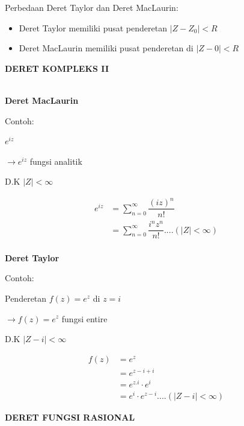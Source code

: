 \documentclass{article}
\begin{document}
Perbedaan Deret Taylor dan Deret MacLaurin:
\begin{itemize}
    \item Deret Taylor memiliki pusat penderetan $|Z-Z_0|<R$
    \item Deret MacLaurin memiliki pusat penderetan di $|Z-0|<R$
\end{itemize}



\newpage
\begin{center}
    \textbf{DERET KOMPLEKS II}
\end{center}
\leavevmode\\

\textbf{Deret MacLaurin}

Contoh:

$e^{iz}$

$\rightarrow e^{iz}$ fungsi analitik

D.K $|Z|<\infty$

\begin{align}
    e^{iz} & = \sum_{n=0}^{\infty} \dfrac{(iz)^n}{n!}
    \nonumber                                                             \\
           & = \sum_{n=0}^{\infty} \dfrac{i^n z^n}{n!} .... (|Z|< \infty)
    \nonumber
\end{align}
\leavevmode\\

\textbf{Deret Taylor}

Contoh:

Penderetan $f(z) = e^z$ di $z = i$

$\rightarrow f(z) = e^z$ fungsi entire

D.K $|Z-i|<\infty$

\begin{align}
    f(z) & = e^z
    \nonumber                                       \\
         & = e^{z-i+i}
    \nonumber                                       \\
         & = e^{z.i} \cdot e^i
    \nonumber                                       \\
         & = e^i \cdot e^{z-i} .... (|Z-i|< \infty)
    \nonumber
\end{align}



\newpage
\begin{center}
    \textbf{DERET FUNGSI RASIONAL}
\end{center}
\leavevmode\\
\end{document}

